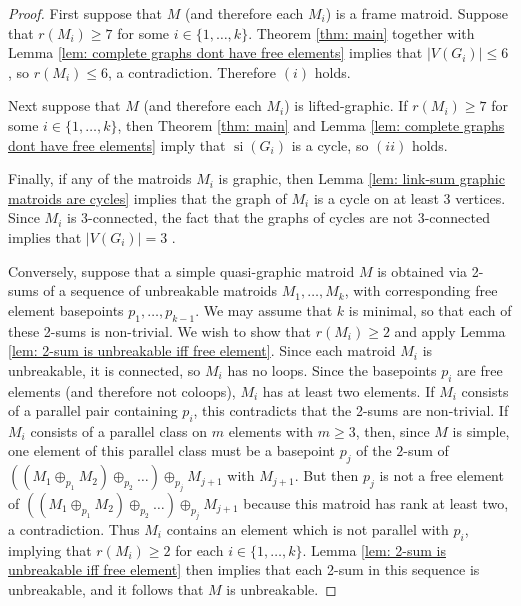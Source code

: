 \documentclass[12pt]{article}
\theoremstyle{definition}
\theoremstyle{plain} %
\DeclareMathOperator{\si}{si}
\begin{document}
\begin{proof}
    First suppose that $M$ (and therefore each $M_i$) is a frame matroid. Suppose that $r(M_i)\geq7$ for some $i\in\{1,\ldots,k\}$. Theorem \ref{thm: main} together with Lemma \ref{lem: complete graphs dont have free elements} implies that $\lvert V(G_i)\rvert\leq6$, so $r(M_i)\leq6$, a contradiction. Therefore $(i)$ holds.

    Next suppose that $M$ (and therefore each $M_i$) is lifted-graphic. If $r(M_i)\geq7$ for some $i\in\{1,\ldots,k\}$, then Theorem \ref{thm: main} and Lemma \ref{lem: complete graphs dont have free elements} imply that $\si(G_i)$ is a cycle, so $(ii)$ holds.

    Finally, if any of the matroids $M_i$ is graphic, then Lemma \ref{lem: link-sum graphic matroids are cycles} implies that the graph of $M_i$ is a cycle on at least 3 vertices.  Since $M_i$ is 3-connected, the fact that the graphs of cycles are not 3-connected implies that $\lvert V(G_i)\rvert=3$ \cite[Proposition 8.1.9]{Oxley2011}.

    Conversely, suppose that a simple quasi-graphic matroid $M$ is obtained via 2-sums of a sequence of unbreakable matroids $M_1,\ldots,M_k$, with corresponding free element basepoints $p_1,\ldots,p_{k-1}$. We may assume that $k$ is minimal, so that each of these 2-sums is non-trivial. We wish to show that $r(M_i)\geq2$ and apply Lemma \ref{lem: 2-sum is unbreakable iff free element}. Since each matroid $M_i$ is unbreakable, it is connected, so $M_i$ has no loops. Since the basepoints $p_i$ are free elements (and therefore not coloops), $M_i$ has at least two elements. If $M_i$ consists of a parallel pair containing $p_i$, this contradicts that the 2-sums are non-trivial. If $M_i$ consists of a parallel class on $m$ elements with $m \ge 3$, then, since $M$ is simple, one element of this parallel class must be a basepoint $p_j$ of the $2$-sum of $((M_1\oplus_{p_1}M_2)\oplus_{p_2}\ldots)\oplus_{p_{j}}M_{j+1}$ with $M_{j+1}$.
    But then $p_j$ is not a free element of $((M_1\oplus_{p_1}M_2)\oplus_{p_2}\ldots)\oplus_{p_{j}}M_{j+1}$ because this matroid has rank at least two, a contradiction.
    Thus $M_i$ contains an element which is not parallel with $p_i$, implying that $r(M_i)\geq2$ for each $i\in\{1,\ldots,k\}$. Lemma \ref{lem: 2-sum is unbreakable iff free element} then implies that each 2-sum in this sequence is unbreakable, and it follows that $M$ is unbreakable.
\end{proof}




\end{document}
